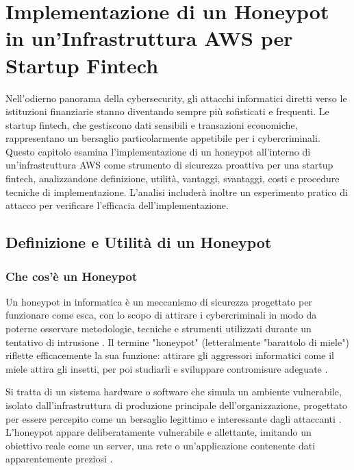 \documentclass[a4paper,12pt]{report}
\begin{document}
\chapter{Implementazione di un Honeypot in un'Infrastruttura AWS per Startup Fintech}
\label{chap:honeypot_aws}

Nell'odierno panorama della cybersecurity, gli attacchi informatici diretti verso le istituzioni finanziarie stanno diventando sempre più sofisticati e frequenti. Le startup fintech, che gestiscono dati sensibili e transazioni economiche, rappresentano un bersaglio particolarmente appetibile per i cybercriminali. Questo capitolo esamina l'implementazione di un honeypot all'interno di un'infrastruttura AWS come strumento di sicurezza proattiva per una startup fintech, analizzandone definizione, utilità, vantaggi, svantaggi, costi e procedure tecniche di implementazione. L'analisi includerà inoltre un esperimento pratico di attacco per verificare l'efficacia dell'implementazione.

\section{Definizione e Utilità di un Honeypot}
\label{sec:def_utilita}

\subsection{Che cos'è un Honeypot}
\label{subsec:cos_e_honeypot}

Un honeypot in informatica è un meccanismo di sicurezza progettato per funzionare come esca, con lo scopo di attirare i cybercriminali in modo da poterne osservare metodologie, tecniche e strumenti utilizzati durante un tentativo di intrusione \cite{proofpoint2024}. Il termine "honeypot" (letteralmente "barattolo di miele") riflette efficacemente la sua funzione: attirare gli aggressori informatici come il miele attira gli insetti, per poi studiarli e sviluppare contromisure adeguate \cite{universeit2021}.

Si tratta di un sistema hardware o software che simula un ambiente vulnerabile, isolato dall'infrastruttura di produzione principale dell'organizzazione, progettato per essere percepito come un bersaglio legittimo e interessante dagli attaccanti \cite{insic2023, perego_2023}. L'honeypot appare deliberatamente vulnerabile e allettante, imitando un obiettivo reale come un server, una rete o un'applicazione contenente dati apparentemente preziosi \cite{proofpoint2024, vienažindytė_2020}.
\end{document}
